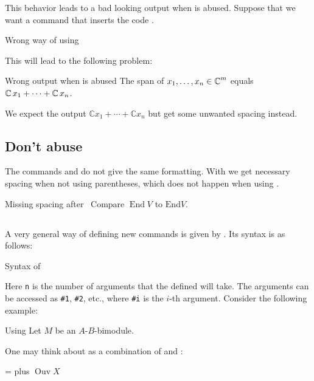 This behavior leads to a bad looking output when  is abused.
Suppose that we want a command  that inserts the code .
\begin{showcode}{Wrong way of using }
\DeclareMathOperator{\Complex}{\mathbb{C}}
\end{showcode}
This will lead to the following problem:
\begin{showlatex}{Wrong output when  is abused}
The span of $x_1, \dotsc, x_n \in \Complex^m$ equals $\Complex x_1 + \dotsb + \Complex x_n$.
\end{showlatex}
We expect the output $\mathbb{C} x_1 + \dotsb + \mathbb{C} x_n$ but get some unwanted spacing instead.



\subsection{Don’t abuse }

The commands  and  do not give the same formatting.
With  we get necessary spacing when not using parentheses, which does not happen when using .
\begin{showlatex}{Missing spacing after~}
Compare $\operatorname{End} V$ to $\mathrm{End} V$.
\end{showlatex}



\subsection{}

A very general way of defining new commands is given by .
Its syntax is as follows:
\begin{showcode}{Syntax of }
\newcommand{\name}[n]{ definition including #1, ..., #n }
\end{showcode}
Here \texttt{n} is the number of arguments that the defined  will take.
The arguments can be accessed as \texttt{\#1}, \texttt{\#2}, etc., where \texttt{\#i} is the $i$-th argument.
Consider the following example:
\begin{showlatex}{Using }
\newcommand{\bimodule}[2]{#1-#2-bimodule}
Let $M$ be an \bimodule{$A$}{$B$}.
\end{showlatex}
One may think about  as a combination of  and :
\begin{showlatex}{ =  plus }
\newcommand{\Ouv}{\operatorname{Ouv}}
$\Ouv X$
\end{showlatex}

